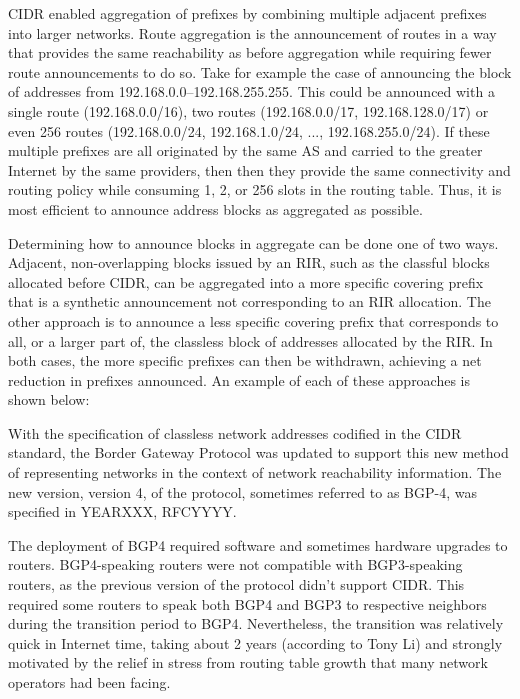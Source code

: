 
CIDR enabled aggregation of prefixes by combining multiple adjacent prefixes into larger networks. Route aggregation is the announcement of routes in a way that provides the same reachability as before aggregation while requiring fewer route announcements to do so. Take for example the case of announcing the block of addresses from 192.168.0.0--192.168.255.255. This could be announced with a single route (192.168.0.0/16), two routes (192.168.0.0/17, 192.168.128.0/17) or even 256 routes (192.168.0.0/24, 192.168.1.0/24, ..., 192.168.255.0/24). If these multiple prefixes are all originated by the same AS and carried to the greater Internet by the same providers, then then they provide the same connectivity and routing policy while consuming 1, 2, or 256 slots in the routing table. Thus, it is most efficient to announce address blocks as aggregated as possible.


Determining how to announce blocks in aggregate can be done one of two ways. Adjacent, non-overlapping blocks issued by an RIR, such as the classful blocks allocated before CIDR, can be aggregated into a more specific covering prefix that is a synthetic announcement not corresponding to an RIR allocation. The other approach is to announce a less specific covering prefix that corresponds to all, or a larger part of, the classless block of addresses allocated by the RIR. In both cases, the more specific prefixes can then be withdrawn, achieving a net reduction in prefixes announced. An example of each of these approaches is shown below:


With the specification of classless network addresses codified in the CIDR standard, the Border Gateway Protocol was updated to support this new method of representing networks in the context of network reachability information. The new version, version 4, of the protocol, sometimes referred to as BGP-4, was specified in YEARXXX, RFCYYYY.

The deployment of BGP4 required software and sometimes hardware upgrades to routers. BGP4-speaking routers were not compatible with BGP3-speaking routers, as the previous version of the protocol didn't support CIDR. This required some routers to speak both BGP4 and BGP3 to respective neighbors during the transition period to BGP4. Nevertheless, the transition was relatively quick in Internet time, taking about 2 years (according to Tony Li) and strongly motivated by the relief in stress from routing table growth that many network operators had been facing.

